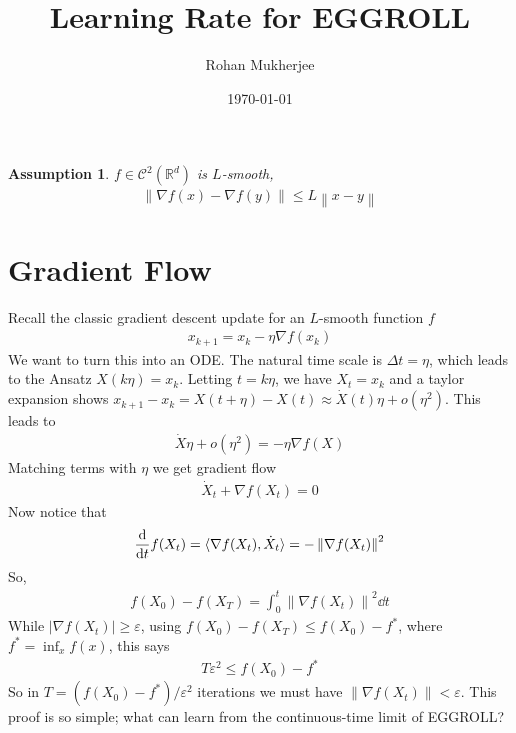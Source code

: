 \documentclass[twoside,11pt]{article}
\title{\bfseries Learning Rate for EGGROLL}
\date{\today}
\author{Rohan Mukherjee}
\newtheorem{assumption}{Assumption}
\def\mbb#1{\mathbb{#1}}
\def \R{\mbb{R}}
\def \ve{\varepsilon}
\newcommand{\mg}[1]{\left \| #1 \right\|}
\renewcommand{\grad}{\nabla}
\newcommand{\1}{\mathbbm{1}}
\begin{document}
\maketitle
\begin{assumption}
    $f \in \mathcal C^2(\R^d)$ is $L$-smooth,
    \begin{align*}
        \mg{\grad f(x) - \grad f(y)} \leq L \mg{x-y}
    \end{align*}
\end{assumption}

\section{Gradient Flow}
Recall the classic gradient descent update for an $L$-smooth function $f$
\begin{align}
    \label{eq:gradient-flow}
    x_{k+1} = x_k - \eta \grad f(x_k)
\end{align}
We want to turn this into an ODE. The natural time scale is $\Delta t = \eta$, which leads to the Ansatz $X(k \eta) = x_k$. Letting $t = k\eta$, we have $X_t = x_k$ and a taylor expansion shows $x_{k+1} - x_k = X(t + \eta) - X(t) \approx \dot X(t) \eta + o(\eta^2)$. This leads to 
\begin{align*}
    \dot X \eta + o(\eta^2) = -\eta \grad f(X)
\end{align*}
Matching terms with $\eta$ we get gradient flow
\begin{align*}
    \dot X_t + \grad f(X_t) = 0
\end{align*}
Now notice that 
\begin{align*}
    \dv{t} f(X_t) = \langle \grad f(X_t), \dot X_t \rangle = -\mg{\grad f(X_t)}^2
\end{align*}
So, 
\begin{align*}
    f(X_0) - f(X_T) = \int_0^t \mg{\grad f(X_t)}^2 \dd t
\end{align*}
While $|\grad f(X_t)| \geq \ve$, using $f(X_0) - f(X_T) \leq f(X_0) - f^*$, where $f^* = \inf_x f(x)$, this says
\begin{align*}
    T \ve^2 \leq f(X_0) - f^*
\end{align*}
So in $T = (f(X_0) -f^*) / \ve^2$ iterations we must have $\mg{\grad f(X_t)} < \ve$. This proof is so simple; what can learn from the continuous-time limit of EGGROLL?
\end{document}
